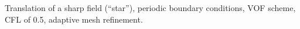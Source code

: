 Translation of a sharp field (``star''), periodic boundary conditions, VOF scheme, CFL of 0.5, adaptive mesh refinement.
